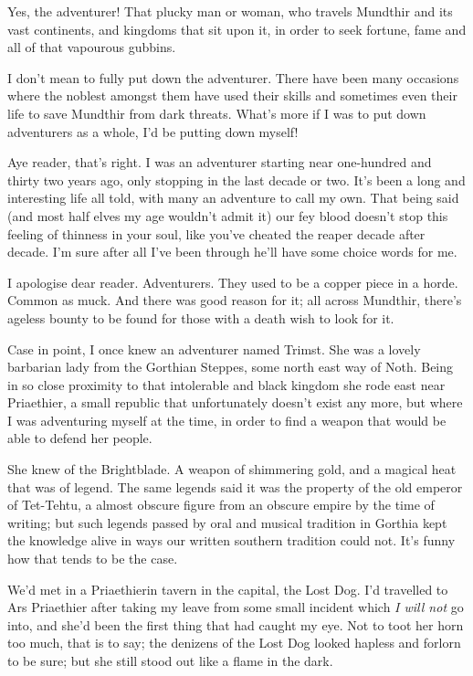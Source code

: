 \documentclass[12pt, a4paper]{book}
\begin{document}
Yes, the adventurer! That plucky man or woman, who travels Mundthir and its vast continents, and kingdoms that sit upon it, in order to seek fortune, fame and all of that vapourous gubbins.

I don't mean to fully put down the adventurer. There have been many occasions where the noblest amongst them have used their skills and sometimes even their life to save Mundthir from dark threats. What's more if I was to put down adventurers as a whole, I'd be putting down myself!

Aye reader, that's right. I was an adventurer starting near one-hundred and thirty two years ago, only stopping in the last decade or two. It's been a long and interesting life all told, with many an adventure to call my own. That being said (and most half elves my age wouldn't admit it) our fey blood doesn't stop this feeling of thinness in your soul, like you've cheated the reaper decade after decade. I'm sure after all I've been through he'll have some choice words for me.

I apologise dear reader. Adventurers. They used to be a copper piece in a horde. Common as muck. And there was good reason for it; all across Mundthir, there's ageless bounty to be found for those with a death wish to look for it. 

Case in point, I once knew an adventurer named Trimst. She was a lovely barbarian lady from the Gorthian Steppes, some north east way of Noth. Being in so close proximity to that intolerable and black kingdom she rode east near Priaethier, a small republic that unfortunately doesn't exist any more, but where I was adventuring myself at the time, in order to find a weapon that would be able to defend her people.

She knew of the Brightblade. A weapon of shimmering gold, and a magical heat that was of legend. The same legends said it was the property of the old emperor of Tet-Tehtu, a almost obscure figure from an obscure empire by the time of writing; but such legends passed by oral and musical tradition in Gorthia kept the knowledge alive in ways our written southern tradition could not. It's funny how that tends to be the case.

We'd met in a Priaethierin tavern in the capital, the Lost Dog. I'd travelled to Ars Priaethier after taking my leave from some small incident which \textit{I will not} go into, and she'd been the first thing that had caught my eye. Not to toot her horn too much, that is to say; the denizens of the Lost Dog looked hapless and forlorn to be sure; but she still stood out like a flame in the dark.
\end{document}
